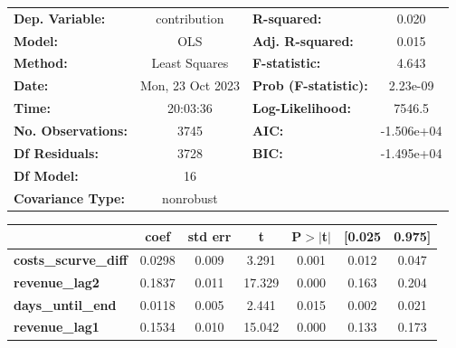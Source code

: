 \begin{center}
\begin{tabular}{lclc}
\toprule
\textbf{Dep. Variable:}                     &   contribution   & \textbf{  R-squared:         } &     0.020   \\
\textbf{Model:}                             &       OLS        & \textbf{  Adj. R-squared:    } &     0.015   \\
\textbf{Method:}                            &  Least Squares   & \textbf{  F-statistic:       } &     4.643   \\
\textbf{Date:}                              & Mon, 23 Oct 2023 & \textbf{  Prob (F-statistic):} &  2.23e-09   \\
\textbf{Time:}                              &     20:03:36     & \textbf{  Log-Likelihood:    } &    7546.5   \\
\textbf{No. Observations:}                  &        3745      & \textbf{  AIC:               } & -1.506e+04  \\
\textbf{Df Residuals:}                      &        3728      & \textbf{  BIC:               } & -1.495e+04  \\
\textbf{Df Model:}                          &          16      & \textbf{                     } &             \\
\textbf{Covariance Type:}                   &    nonrobust     & \textbf{                     } &             \\
\bottomrule
\end{tabular}
\begin{tabular}{lcccccc}
                                            & \textbf{coef} & \textbf{std err} & \textbf{t} & \textbf{P$> |$t$|$} & \textbf{[0.025} & \textbf{0.975]}  \\
\midrule
\textbf{costs\_scurve\_diff}                &       0.0298  &        0.009     &     3.291  &         0.001        &        0.012    &        0.047     \\
\textbf{revenue\_lag2}                      &       0.1837  &        0.011     &    17.329  &         0.000        &        0.163    &        0.204     \\
\textbf{days\_until\_end}                   &       0.0118  &        0.005     &     2.441  &         0.015        &        0.002    &        0.021     \\
\textbf{revenue\_lag1}                      &       0.1534  &        0.010     &    15.042  &         0.000        &        0.133    &        0.173     \\

\end{tabular}
\end{center}
